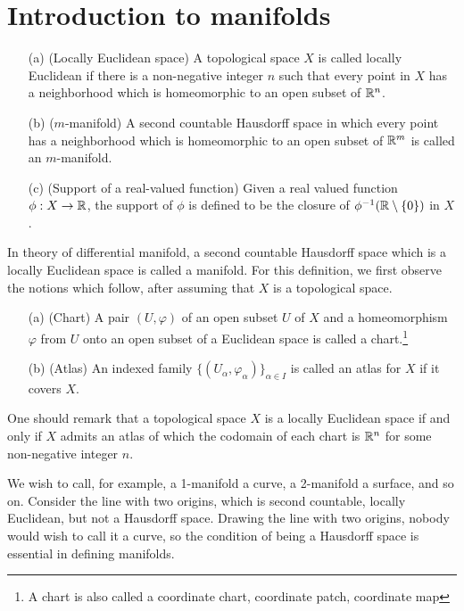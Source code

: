 \section{Introduction to manifolds}

\begin{defi}
    \begin{enumerate}
        \item[(a)]
        {
            (Locally Euclidean space)
            A topological space $X$ is called locally Euclidean if there is a non-negative integer $n$ such that every point in $X$ has a neighborhood which is homeomorphic to an open subset of ${\mathbb{R}}^n$.
        }
        \item[(b)]
        {
            ($m$-manifold)
            A second countable Hausdorff space in which every point has a neighborhood which is homeomorphic to an open subset of ${\mathbb{R}}^m$ is called an $m$-manifold.
        }
        \item[(c)]
        {
            (Support of a real-valued function)
            Given a real valued function $\phi: X\rightarrow{\mathbb{R}}$, the support of $\phi$ is defined to be the closure of $\phi^{-1}({\mathbb{R}}\setminus\{0\})$ in $X$.
        }
    \end{enumerate}
\end{defi}
\begin{rmk}
    In theory of differential manifold, a second countable Hausdorff space which is a locally Euclidean space is called a manifold.
    For this definition, we first observe the notions which follow, after assuming that $X$ is a topological space.
    \begin{enumerate}
        \item[(a)]
        {
            (Chart)
            A pair $(U, \varphi)$ of an open subset $U$ of $X$ and a homeomorphism $\varphi$ from $U$ onto an open subset of a Euclidean space is called a chart.\footnote{A chart is also called a coordinate chart, coordinate patch, coordinate map}
        }
        \item[(b)]
        {
            (Atlas)
            An indexed family $\{(U_\alpha, \varphi_\alpha)\}_{\alpha\in I}$ is called an atlas for $X$ if it covers $X$.
        }
    \end{enumerate}
    One should remark that a topological space $X$ is a locally Euclidean space if and only if $X$ admits an atlas of which the codomain of each chart is ${\mathbb{R}}^n$ for some non-negative integer $n$.
\end{rmk}
\begin{rmk}
    We wish to call, for example, a 1-manifold a curve, a 2-manifold a surface, and so on.
    Consider the line with two origins, which is second countable, locally Euclidean, but not a Hausdorff space.
    Drawing the line with two origins, nobody would wish to call it a curve, so the condition of being a Hausdorff space is essential in defining manifolds.
\end{rmk}

